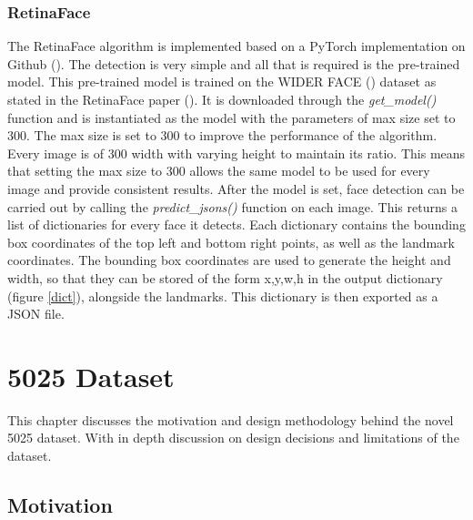 \documentclass{l4proj}
\begin{document}
\subsection{RetinaFace}
The RetinaFace algorithm is implemented based on a PyTorch implementation on Github (\cite{retinagit}). The detection is very simple and all that is required is the pre-trained model. This pre-trained model is trained on the WIDER FACE (\cite{widerface}) dataset as stated in the RetinaFace paper (\cite{retinaface}). It is downloaded through the \textit{get\_model()} function and is instantiated as the model with the parameters of max size set to 300. The max size is set to 300 to improve the performance of the algorithm. Every image is of 300 width with varying height to maintain its ratio. This means that setting the max size to 300 allows the same model to be used for every image and provide consistent results. After the model is set, face detection can be carried out by calling the \textit{predict\_jsons()} function on each image. This returns a list of dictionaries for every face it detects. Each dictionary contains the bounding box coordinates of the top left and bottom right points, as well as the landmark coordinates. The bounding box coordinates are used to generate the height and width, so that they can be stored of the form x,y,w,h in the output dictionary (figure \ref{dict}),
alongside the landmarks. This dictionary is then exported as a JSON file.
\chapter{5025 Dataset}
\label{dataset}
This chapter discusses the motivation and design methodology behind the novel 5025 dataset. With in depth discussion on design decisions and limitations of the dataset.
\section{Motivation}
\label{datasetmotivation}
\end{document}
